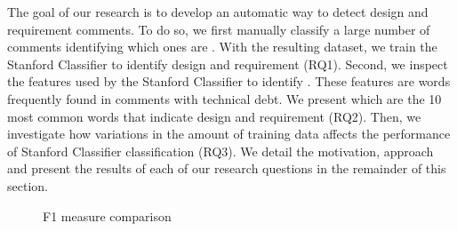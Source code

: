 The goal of our research is to develop an automatic way to detect design and requirement \SATD comments. To do so, we first manually classify a large number of comments identifying which ones are \SATD. With the resulting dataset, we train the Stanford Classifier to identify design and requirement \SATD (RQ1). Second, we inspect the features used by the Stanford Classifier to identify \SATD. These features are words frequently found in comments with technical debt. We present which are the 10 most common words that indicate design and requirement \SATD (RQ2). Then, we investigate how variations in the amount of training data affects the performance of Stanford Classifier classification (RQ3). We detail the motivation, approach and present the results of each of our research questions in the remainder of this section.    

\begin{figure}[!thb]
  \centering
  \caption{F1 measure comparison}
\end{figure}

